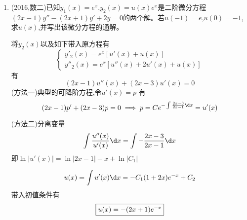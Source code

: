\documentclass[12pt, a4paper, oneside, UTF8]{ctexbook}
\begin{document}
\begin{enumerate}[label=\arabic*.,start=8]
    \begin{solution}
    (方法一) 带入原方程求解a,b,c即 
    $$
    \begin{cases}
        y=\frac{1}{2}e^{2x}+(x-\frac{1}{3})e^x \\
        y'=e^{2x}+(x+\frac{2}{3})e^x \\
        y''=2e^{2x}+(x+\frac{5}{3})e^x \\
        y''+ay'+by=ce^x 
    \end{cases} \implies \begin{cases}
        2+a+\frac{b}{2} = 0 \\
        1+a+b = 0 \\
        \frac{5}{3}+\frac{2a}{3}-\frac{b}{3} = c 
    \end{cases} \implies \begin{cases}
        a = -3 \\
        b = 2 \\
        c = -1
    \end{cases}
    $$
    (方法二)利用解的特性反推微分方程 
    $$
    y=\frac{1}{2}e^{2x}-\frac{1}{3}e^x+xe^x
    $$
    显然其齐次方程的解为$\displaystyle \frac{1}{2}e^{2x}-\frac{1}{3}e^x$,非齐次特解为 $xe^x$,故可以推导出该
    微分方程的齐次通解为$C_1e^{2x}+C_2e^x$,则其特征方程为$(r-2)(r-1)=0$,从而可知$a=-3,b=2$,将非齐次特解带入可以求出$c=-1$
    \end{solution}
    
    \item (2016,数二)已知$y_1(x)=e^x$,$y_2(x)=u(x)e^x$是二阶微分方程$(2x-1)y''-(2x+1)y'+2y=0$的两个解。若$u(-1)=e$,$u(0)=-1$,求$u(x)$,并写出该微分方程的通解。
    
    \begin{solution}
    将$y_2(x)$以及如下带入原方程有
    $$
    \begin{cases}
        y'_2(x) = e^x\left[u'(x)+u(x)\right] \\
        y''_2(x) = e^x\left[u''(x)+2u'(x)+u(x)\right]
    \end{cases}
    $$
    有
    $$
    (2x-1)u''(x)+(2x-3)u'(x) = 0
    $$
    (方法一)典型的可降阶方程,令$u'(x)=p$ 有
    $$
    (2x-1)p'+(2x-3)p = 0 \implies p = Ce^{-\int\frac{2x-3}{2x-1}\d x} = u'(x)
    $$

    (方法二)分离变量
    $$
    \int\frac{u''(x)}{u'(x)}\d x = \int -\frac{2x-3}{2x-1}\d x 
    $$
    即$\ln{\left|u'(x)\right|} = \ln{\left|2x-1\right|} - x + \ln{\left|C_1\right|}$

    $$
    u(x)=\int u'(x)\d x = -C_1(1+2x)e^{-x} + C_2 
    $$
    带入初值条件有
    $$
    \fbox{$u(x)=-(2x+1)e^{-x}$}
    $$
    \end{solution}
    

\end{enumerate}
\end{document}
